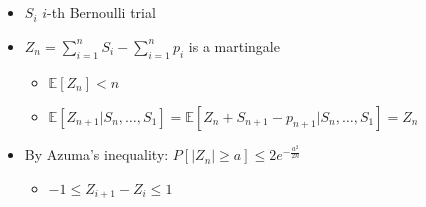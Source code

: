 \documentclass[a4paper]{article}
\begin{document}
\section{}
\begin{itemize}
        \begin{figure} [H]
            \texttt{[image: image/10.png]}
        \end{figure}
    \item $S_i$ $i$-th Bernoulli trial
    \item $Z_n = \sum_{i=1}^n S_i - \sum_{i=1}^n p_i$ is a martingale
        \begin{itemize}
            \item $\mathbb{E}[Z_n] < n$
            \item $\mathbb{E}[Z_{n+1}|S_n, \dots, S_1] = \mathbb{E}[Z_n + S_{n+1} - p_{n+1}|S_n, \dots, S_1] = Z_n$
        \end{itemize}
    \item By Azuma's inequality: $P[|Z_n| \geq a] \leq 2 e^{-\frac{a^2}{2n}}$
        \begin{itemize}
            \item $-1 \leq Z_{i+1} - Z_i \leq 1$
        \end{itemize}
\end{itemize}
\end{document}

